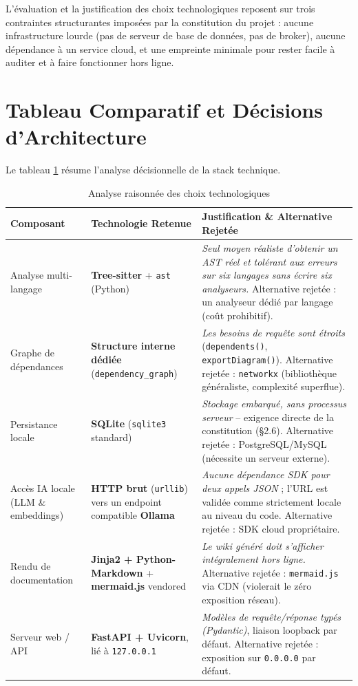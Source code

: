 \documentclass[12pt,a4paper]{report}
\begin{document}
L'évaluation et la justification des choix technologiques reposent sur trois
contraintes structurantes imposées par la constitution du projet : aucune
infrastructure lourde (pas de serveur de base de données, pas de broker), aucune
dépendance à un service cloud, et une empreinte minimale pour rester facile à
auditer et à faire fonctionner hors ligne.

\section{Tableau Comparatif et Décisions d'Architecture}
Le tableau \ref{tab:stack} résume l'analyse décisionnelle de la stack technique.

\begin{table}[H]
\centering
\small
\begin{tabular}{p{3.2cm}p{5.5cm}p{5.5cm}}
\toprule
\textbf{Composant} & \textbf{Technologie Retenue} & \textbf{Justification \& Alternative Rejetée} \\
\midrule
Analyse multi-langage & \textbf{Tree-sitter} + \texttt{ast} (Python) & \textit{Seul moyen réaliste d'obtenir un AST réel et tolérant aux erreurs sur six langages sans écrire six analyseurs.} Alternative rejetée : un analyseur dédié par langage (coût prohibitif). \\
\midrule
Graphe de dépendances & \textbf{Structure interne dédiée} (\texttt{dependency\_graph}) & \textit{Les besoins de requête sont étroits} (\texttt{dependents()}, \texttt{exportDiagram()}). Alternative rejetée : \texttt{networkx} (bibliothèque généraliste, complexité superflue). \\
\midrule
Persistance locale & \textbf{SQLite} (\texttt{sqlite3} standard) & \textit{Stockage embarqué, sans processus serveur} -- exigence directe de la constitution (§2.6). Alternative rejetée : PostgreSQL/MySQL (nécessite un serveur externe). \\
\midrule
Accès IA locale (LLM \& embeddings) & \textbf{HTTP brut} (\texttt{urllib}) vers un endpoint compatible \textbf{Ollama} & \textit{Aucune dépendance SDK pour deux appels JSON} ; l'URL est validée comme strictement locale au niveau du code. Alternative rejetée : SDK cloud propriétaire. \\
\midrule
Rendu de documentation & \textbf{Jinja2 + Python-Markdown} + \textbf{mermaid.js} vendored & \textit{Le wiki généré doit s'afficher intégralement hors ligne.} Alternative rejetée : \texttt{mermaid.js} via CDN (violerait le zéro exposition réseau). \\
\midrule
Serveur web / API & \textbf{FastAPI + Uvicorn}, lié à \texttt{127.0.0.1} & \textit{Modèles de requête/réponse typés (Pydantic)}, liaison loopback par défaut. Alternative rejetée : exposition sur \texttt{0.0.0.0} par défaut. \\
\bottomrule
\end{tabular}
\\ \vspace{0.2cm}
\caption{Analyse raisonnée des choix technologiques}
\label{tab:stack}
\end{table}
\end{document}
